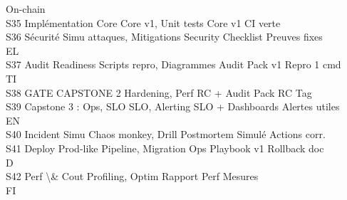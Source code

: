 On-chain\\
S35 Implémentation Core                  Core v1, Unit tests              Core v1                  CI verte\\
S36 Sécurité                             Simu attaques, Mitigations       Security Checklist       Preuves fixes\\
\vspace{0.5em}
\vspace{0.5em}
\vspace{0.5em}
\vspace{0.5em}
EL\\
S37 Audit Readiness                      Scripts repro, Diagrammes        Audit Pack v1            Repro 1 cmd\\
\vspace{0.5em}
\vspace{0.5em}
\vspace{0.5em}
\vspace{0.5em}
TI\\
S38 GATE CAPSTONE 2                      Hardening, Perf                  RC + Audit Pack          RC Tag\\
S39 Capstone 3 : Ops, SLO                SLO, Alerting                    SLO + Dashboards         Alertes utiles\\
\vspace{0.5em}
\vspace{0.5em}
\vspace{0.5em}
\vspace{0.5em}
EN\\
S40 Incident Simu                        Chaos monkey, Drill              Postmortem Simulé        Actions corr.\\
S41 Deploy Prod-like                     Pipeline, Migration              Ops Playbook v1          Rollback doc\\
\vspace{0.5em}
\vspace{0.5em}
\vspace{0.5em}
\vspace{0.5em}
D\\
S42 Perf \textbackslash{}& Cout                          Profiling, Optim                 Rapport Perf             Mesures\\
\vspace{0.5em}
\vspace{0.5em}
\vspace{0.5em}
\vspace{0.5em}
FI\\
